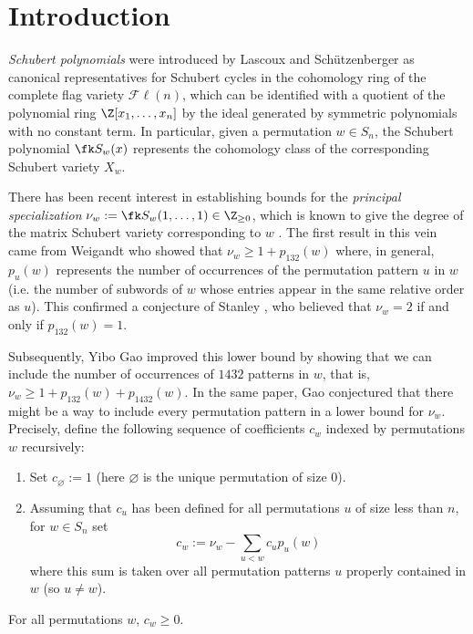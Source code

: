 \section{Introduction}

\textit{Schubert polynomials} were introduced by Lascoux and Sch\"utzenberger \cite{LS82a} as canonical representatives for Schubert cycles in the cohomology ring of the complete flag variety $\mathcal{F}\ell(n)$, which can be identified with a quotient of the polynomial ring $\Z[x_1,\dots,x_n]$ by the ideal generated by symmetric polynomials with no constant term.
In particular, given a permutation $w\in S_n$, the Schubert polynomial $\fk S_w(x)$ represents the cohomology class of the corresponding Schubert variety $X_w$.

There has been recent interest in establishing bounds for the \textit{principal specialization} $\nu_w := \fk S_w(1,\dots,1) \in \Z_{\geq0}$, which is known to give the degree of the matrix Schubert variety corresponding to $w$ \cite{KM05}.
The first result in this vein came from Weigandt \cite{Wei18} who showed that $\nu_w \geq 1 + p_{132}(w)$ where, in general, $p_u(w)$ represents the number of occurrences of the permutation pattern $u$ in $w$ (i.e. the number of subwords of $w$ whose entries appear in the same relative order as $u$).
This confirmed a conjecture of Stanley \cite{Sta17}, who believed that $\nu_w = 2$ if and only if $p_{132}(w)=1$.

Subsequently, Yibo Gao \cite{Gao21} improved this lower bound by showing that we can include the number of occurrences of $1432$ patterns in $w$, that is, $\nu_w \geq 1 + p_{132}(w) + p_{1432}(w)$.
In the same paper, Gao conjectured that there might be a way to include every permutation pattern in a lower bound for $\nu_w$.
Precisely, define the following sequence of coefficients $c_w$ indexed by permutations $w$ recursively:
\begin{enumerate}
    \item Set $c_\varnothing := 1$ (here $\varnothing$ is the unique permutation of size $0$).
    \item Assuming that $c_u$ has been defined for all permutations $u$ of size less than $n$, for $w\in S_n$ set \[
        c_w := \nu_w - \sum_{u< w} c_up_u(w)
    \] where this sum is taken over all permutation patterns $u$ properly contained in $w$ (so $u\neq w$).
\end{enumerate}

\begin{conjecture}
\label{conj:gao}
    For all permutations $w$, $c_w\geq 0$.
\end{conjecture}

